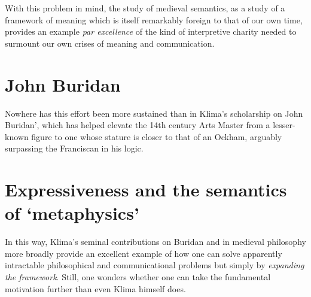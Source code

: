 \documentclass[]{article}
\begin{document}
With this problem in mind, the study of medieval semantics, 
as a study of a framework of meaning which is itself remarkably foreign to that of our own time, 
provides an example \emph{par excellence} of the kind of interpretive charity needed to surmount our own crises of meaning and communication. 
\section{John Buridan}
Nowhere has this effort been more sustained than in Klima's scholarship on John Buridan', 
which has helped elevate the 14th century Arts Master from a lesser-known figure to one whose stature is closer to that of an Ockham, 
arguably surpassing the Franciscan in his logic.

\section{Expressiveness and the semantics of `metaphysics'}
In this way, 
Klima's seminal contributions on Buridan and in medieval philosophy more broadly provide an excellent example of how one can solve apparently intractable philosophical and communicational problems 
but simply by \emph{expanding the framework}.
Still, one wonders whether one can take the fundamental motivation further than even Klima himself does. 
\end{document}
